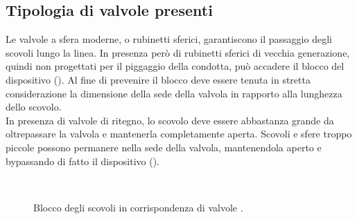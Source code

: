 \subsection{Tipologia di valvole presenti}
Le valvole a sfera moderne, o rubinetti sferici, garantiscono il passaggio degli scovoli lungo la linea. In presenza però di rubinetti sferici di vecchia generazione, quindi non progettati per il piggaggio della condotta, può accadere il blocco del dispositivo (). Al fine di prevenire il blocco deve essere tenuta in stretta considerazione la dimensione della sede della valvola in rapporto alla lunghezza dello scovolo.\\
In presenza di valvole di ritegno, lo scovolo deve essere abbastanza grande da oltrepassare la valvola e mantenerla completamente aperta. Scovoli e sfere troppo piccole possono permanere nella sede della valvola, mantenendola aperto e bypassando di fatto il dispositivo ().
\begin{figure}[htbp]
    \centering
    \qquad
    \\
    \caption{Blocco degli scovoli in corrispondenza di valvole \parencite{guadagni2003prontuario}.}
    \label{fig:piggaggio-valvole}
\end{figure}

